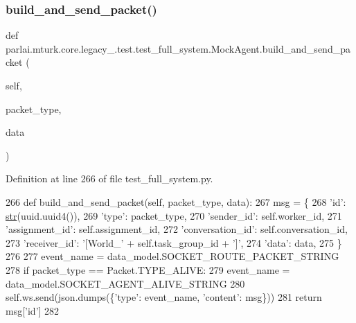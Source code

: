 \subsubsection{\texorpdfstring{build\+\_\+and\+\_\+send\+\_\+packet()}{build\_and\_send\_packet()}}
{\footnotesize\ttfamily def parlai.\+mturk.\+core.\+legacy\+\_.\+test.\+test\+\_\+full\+\_\+system.\+Mock\+Agent.\+build\+\_\+and\+\_\+send\+\_\+packet (\begin{DoxyParamCaption}\item[{}]{self,  }\item[{}]{packet\+\_\+type,  }\item[{}]{data }\end{DoxyParamCaption})}



Definition at line 266 of file test\+\_\+full\+\_\+system.\+py.


\begin{DoxyCode}
266     \textcolor{keyword}{def }build\_and\_send\_packet(self, packet\_type, data):
267         msg = \{
268             \textcolor{stringliteral}{'id'}: \hyperlink{namespacegenerate__task__READMEs_a5b88452ffb87b78c8c85ececebafc09f}{str}(uuid.uuid4()),
269             \textcolor{stringliteral}{'type'}: packet\_type,
270             \textcolor{stringliteral}{'sender\_id'}: self.worker\_id,
271             \textcolor{stringliteral}{'assignment\_id'}: self.assignment\_id,
272             \textcolor{stringliteral}{'conversation\_id'}: self.conversation\_id,
273             \textcolor{stringliteral}{'receiver\_id'}: \textcolor{stringliteral}{'[World\_'} + self.task\_group\_id + \textcolor{stringliteral}{']'},
274             \textcolor{stringliteral}{'data'}: data,
275         \}
276 
277         event\_name = data\_model.SOCKET\_ROUTE\_PACKET\_STRING
278         \textcolor{keywordflow}{if} packet\_type == Packet.TYPE\_ALIVE:
279             event\_name = data\_model.SOCKET\_AGENT\_ALIVE\_STRING
280         self.ws.send(json.dumps(\{\textcolor{stringliteral}{'type'}: event\_name, \textcolor{stringliteral}{'content'}: msg\}))
281         \textcolor{keywordflow}{return} msg[\textcolor{stringliteral}{'id'}]
282 
\end{DoxyCode}
\mbox{\label{classparlai_1_1mturk_1_1core_1_1legacy__2018_1_1test_1_1test__full__system_1_1MockAgent_a85d55e9838b31689c8bba73150d046b0}} 

